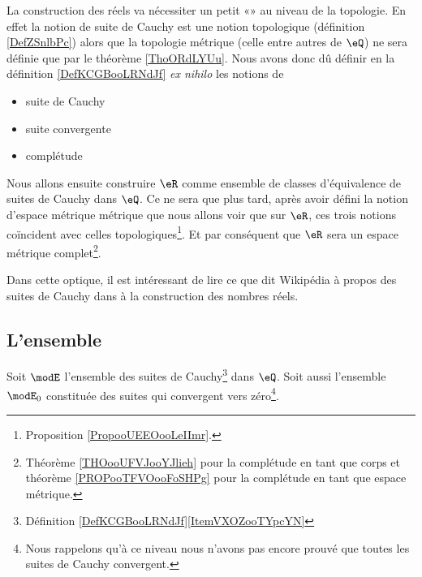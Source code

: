 \begin{normaltext}      \label{NormooHRDZooRGGtCd}
    La construction des réels va nécessiter un petit «» au niveau de la topologie. En effet la notion de suite de Cauchy est une notion topologique (définition \ref{DefZSnlbPc}) alors que la topologie métrique (celle entre autres de \( \eQ\)) ne sera définie que par le théorème \ref{ThoORdLYUu}. Nous avons donc dû définir en la définition \ref{DefKCGBooLRNdJf} \emph{ex nihilo} les notions de
\begin{itemize}
    \item
        suite de Cauchy 
    \item
        suite convergente
    \item
        complétude
\end{itemize}
Nous allons ensuite construire \( \eR\) comme ensemble de classes d'équivalence de suites de Cauchy dans \( \eQ\). Ce ne sera que plus tard, après avoir défini la notion d'espace métrique métrique que nous allons voir que sur \( \eR\), ces trois notions coïncident avec celles topologiques\footnote{Proposition \ref{PropooUEEOooLeIImr}.}. Et par conséquent que \( \eR\) sera un espace métrique complet\footnote{Théorème \ref{THOooUFVJooYJlieh} pour la complétude en tant que corps et théorème \ref{PROPooTFVOooFoSHPg} pour la complétude en tant que espace métrique.}.

Dans cette optique, il est intéressant de lire ce que dit Wikipédia à propos des suites de Cauchy dans  à la construction des nombres réels.
\end{normaltext}

\subsection{L'ensemble}

Soit \( \modE\) l'ensemble des suites de Cauchy\footnote{Définition \ref{DefKCGBooLRNdJf}\ref{ItemVXOZooTYpcYN}} dans \( \eQ\). Soit aussi l'ensemble \( \modE_0\) constituée des suites qui convergent vers zéro\footnote{Nous rappelons qu'à ce niveau nous n'avons pas encore prouvé que toutes les suites de Cauchy convergent.}.

